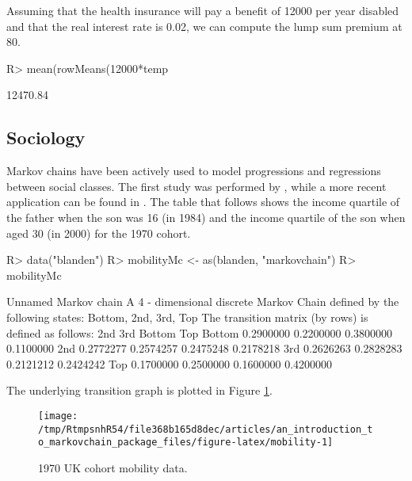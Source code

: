 \documentclass[
  nojss]{jss}
\begin{document}
Assuming that the health insurance will pay a benefit of 12000 per year disabled and that the real interest rate is 0.02, we can compute the lump sum premium at 80.

\begin{CodeChunk}

\begin{CodeInput}
R> mean(rowMeans(12000*temp%
\end{CodeInput}

\begin{CodeOutput}
[1] 12470.84
\end{CodeOutput}
\end{CodeChunk}

\hypertarget{app:sociology}{%
\subsection{Sociology}\label{app:sociology}}

Markov chains have been actively used to model progressions and regressions between social classes. The first study was performed by \cite{glassHall}, while a more recent application can be found in \cite{blandenEtAlii}. The table that follows shows the income quartile of the father when the son was 16 (in 1984) and the income quartile of the son when aged 30 (in 2000) for the 1970 cohort.

\begin{CodeChunk}

\begin{CodeInput}
R> data("blanden")
R> mobilityMc <- as(blanden, "markovchain")
R> mobilityMc
\end{CodeInput}

\begin{CodeOutput}
Unnamed Markov chain 
 A  4 - dimensional discrete Markov Chain defined by the following states: 
 Bottom, 2nd, 3rd, Top 
 The transition matrix  (by rows)  is defined as follows: 
             2nd       3rd    Bottom       Top
Bottom 0.2900000 0.2200000 0.3800000 0.1100000
2nd    0.2772277 0.2574257 0.2475248 0.2178218
3rd    0.2626263 0.2828283 0.2121212 0.2424242
Top    0.1700000 0.2500000 0.1600000 0.4200000
\end{CodeOutput}
\end{CodeChunk}

The underlying transition graph is plotted in Figure \ref{fig:mobility}.

\begin{CodeChunk}
\begin{figure}

{\centering \texttt{[image: /tmp/RtmpsnhR54/file368b165d8dec/articles/an\_introduction\_to\_markovchain\_package\_files/figure-latex/mobility-1]} 

}

\caption[1970 UK cohort mobility data]{1970 UK cohort mobility data.}\label{fig:mobility}
\end{figure}
\end{CodeChunk}
\end{document}
